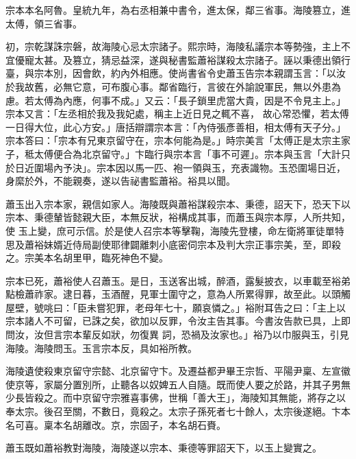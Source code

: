 \begin{pinyinscope}
 宗本本名阿魯。皇統九年，為右丞相兼中書令，進太保，鄰三省事。海陵篡立，進太傅，領三省事。



 初，宗乾謀誅宗磐，故海陵心忌太宗諸子。熙宗時，海陵私議宗本等勢強，主上不宜優寵太甚。及篡立，猜忌益深，遂與秘書監蕭裕謀殺太宗諸子。誣以秉德出領行臺，與宗本別，因會飲，約內外相應。使尚書省令史蕭玉告宗本親謂玉言：「以汝於我故舊，必無它意，可布腹心事。鄰省臨行，言彼在外諭說軍民，無以外患為慮。若太傅為內應，何事不成。」又云：「長子鎖里虎當大貴，因是不令見主上。」宗本又言：「左丞相於我及我妃處，稱主上近日見之輒不喜，
 故心常恐懼，若太傅一日得大位，此心方安。」唐括辯謂宗本言：「內侍張彥善相，相太傅有天子分。」宗本答曰：「宗本有兄東京留守在，宗本何能為是。」時宗美言「太傅正是太宗主家子，秪太傅便合為北京留守。」卞臨行與宗本言「事不可遲」。宗本與玉言「大計只於日近圍場內予決」。宗本因以馬一匹、袍一領與玉，充表識物。玉恐圍場日近，身縻於外，不能親奏，遂以告祕書監蕭裕。裕具以聞。



 蕭玉出入宗本家，親信如家人。海陵既與蕭裕謀殺宗本、秉德，詔天下，恐天下以宗本、秉德輦皆懿親大臣，本無反狀，裕構成其事，而蕭玉與宗本厚，人所共知，使
 玉上變，庶可示信。於是使人召宗本等擊鞠，海陵先登樓，命左衛將軍徒單特思及蕭裕妹婿近侍局副使耶律闢離刺小底密伺宗本及判大宗正事宗美，至，即殺之。宗美本名胡里甲，臨死神色不變。



 宗本已死，蕭裕使人召蕭玉。是日，玉送客出城，醉酒，露髮披衣，以車載至裕弟點檢蕭祚家。逮日暮，玉酒醒，見軍士圍守之，意為人所累得罪，故至此。以頭觸屋壁，號咷曰：「臣未嘗犯罪，老母年七十，願哀憐之。」裕附耳告之曰：「主上以宗本諸人不可留，已誅之矣，欲加以反罪，令汝主告其事。今書汝告款已具，上即問汝，汝但言宗本輩反如狀，勿復異
 詞，恐禍及汝家也。」裕乃以巾服與玉，引見海陵。海陵問玉。玉言宗本反，具如裕所教。



 海陵遺使殺東京留守宗懿、北京留守卞。及遷益都尹畢王宗哲、平陽尹稟、左宣徽使京等，家屬分置別所，止聽各以奴婢五人自隨。既而使人要之於路，并其子男無少長皆殺之。而中京留守宗雅喜事佛，世稱「善大王」，海陵知其無能，將存之以奉太宗。後召至關，不數日，竟殺之。太宗子孫死者七十餘人，太宗後遂絕。卞本名可喜。稟本名胡離改。京，宗固子，本名胡石賚。



 蕭玉既如蕭裕教對海陵，海陵遂以宗本、秉德等罪詔天下，以玉上變實之。




\end{pinyinscope}
